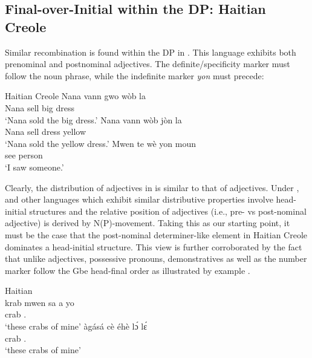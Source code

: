 \documentclass[output=paper]{langsci/langscibook}
\begin{document}
\subsection{Final-over-Initial within the DP: Haitian Creole}

Similar recombination is found within the DP in 
\parencite{AbohDeGraff2014,Aboh2015}. This language exhibits both prenominal
and postnominal adjectives. The definite/specificity marker must follow the
noun phrase, while the indefinite marker \emph{yon} must precede:

\ea\label{ex:aboh:14.12} Haitian Creole \parencite[117--118]{DeGraff2007}
    \ea
        \gll    Nana vann gwo wòb la \\
                Nana sell big dress \Det{} \\
        \glt    \enquote*{Nana sold the big dress.}
    \ex
        \gll    Nana vann wòb jòn la \\
                Nana sell dress yellow \Det{} \\
        \glt    \enquote*{Nana sold the yellow dress.}
    \ex\label{ex:aboh:14.12c}
        \gll    Mwen te wè yon moun \\
                \Fsg{} \Ant{} see \Det{} person \\
        \glt    \enquote*{I saw someone.}
    \z
\z

Clearly, the distribution of adjectives in  is similar to\largerpage
that of  adjectives. Under \citet{Cinque2010},  and other 
languages which exhibit similar distributive properties involve head-initial
structures and the relative position of adjectives (i.e., pre- vs post-nominal
adjective) is derived by N(P)-movement. Taking this as our starting point, it
must be the case that the post-nominal determiner-like element in Haitian
Creole dominates a head-initial structure. This view is further corroborated by
the fact that unlike adjectives, possessive pronouns, demonstratives as well as
the number marker follow the Gbe head-final order as illustrated by example
.

\ea\label{ex:aboh:14.13}
    \ea Haitian \parencite[78]{Lefebvre1998}\\
    \sn
        \gll    krab mwen sa a yo\\
                crab \First{}.\Poss{} \Dem{} \Det{} \Pl{} \\
        \glt    \enquote*{these crabs of mine}
    \ex {} \parencite{Aboh2004a,Aboh2004b}
    \sn
        \gll    àgásá cè éhè l\'ɔ l\'ɛ \\
                crab \First{}.\Poss{} \Dem{} \Det{} \Pl{} \\
        \glt    \enquote*{these crabs of mine}
    \z
\z
\end{document}
